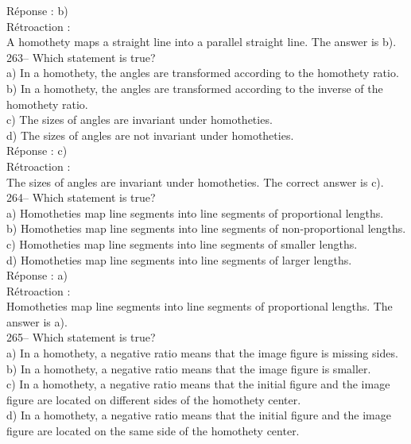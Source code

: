 \documentclass[letterpaper, 12pt]{article}
\begin{document}
R\'eponse : b)\\

R\'etroaction : \\
A homothety maps a straight line into a parallel straight line. The
answer is b).\\

263--  Which statement is true?\\

a) In a homothety, the angles are transformed according to the
homothety ratio.\\
b) In a homothety, the angles are transformed according to the
inverse of the homothety ratio.\\
c) The sizes of angles are invariant under homotheties.\\
d) The sizes of angles are not invariant under homotheties.\\

R\'eponse : c)\\

R\'etroaction :\\
The sizes of angles are invariant under homotheties. The correct
answer is c). \\

264-- Which statement is true?\\

a) Homotheties map line segments into line segments of
proportional lengths.\\
b) Homotheties map line segments into line segments of
non-proportional lengths.\\
c) Homotheties map line segments into line segments of smaller
lengths.\\
d) Homotheties map line segments into line segments of larger
lengths.\\

R\'eponse : a)\\

R\'etroaction :\\
Homotheties map line segments into line segments of proportional
lengths. The answer is a).\\

265-- Which statement is true?\\

a) In a homothety, a negative ratio means that the image figure is
missing sides.\\
b) In a homothety, a negative ratio means that the image figure is
smaller.\\
c) In a homothety, a negative ratio means that the initial figure
and the image figure are located on different sides of the homothety
center.\\
d) In a homothety, a negative ratio means that the initial figure
and the image figure are located on the same side of the homothety
center.\\
\end{document}
